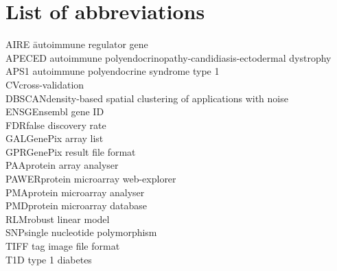 \chapter*{List of abbreviations}

\begin{tabbing}
    AIRE \indent\indent \= autoimmune regulator gene \\
    APECED \> autoimmune polyendocrinopathy-candidiasis-ectodermal dystrophy \\
    APS1 \> autoimmune polyendocrine syndrome type 1 \\
    CV\>cross-validation \\
    DBSCAN\>density-based spatial clustering of applications with noise \\
    ENSG\>Ensembl gene ID \\
    FDR\>false discovery rate \\
    GAL\>GenePix array list \\
    GPR\>GenePix result file format \\
    PAA\>protein array analyser \\
    PAWER\>protein microarray web-explorer \\
    PMA\>protein microarray analyser \\
    PMD\>protein microarray database \\
    RLM\>robust linear model \\ 
    SNP\>single nucleotide polymorphism \\
    TIFF \> tag image file format \\
    T1D \> type 1 diabetes
\end{tabbing}



